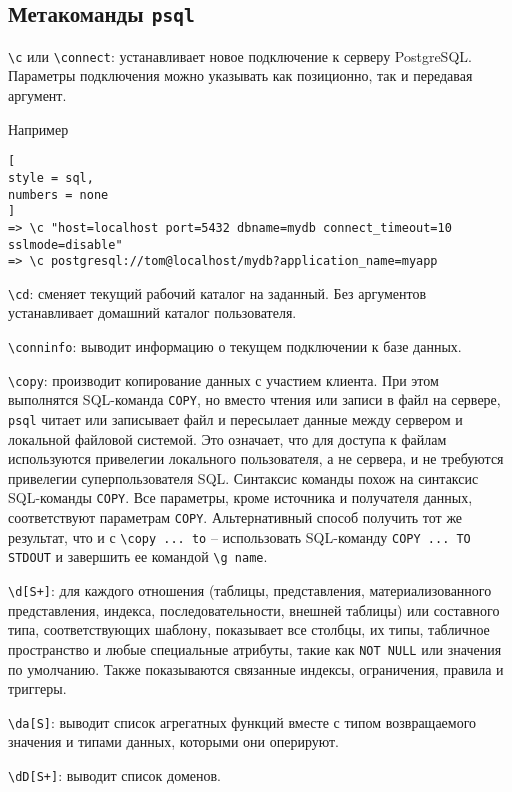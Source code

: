 \documentclass[%
	11pt,
	a4paper,
	utf8,
		]{article}
\begin{document}
\subsection{Метакоманды \texttt{psql}}

\noindent \verb|\c| или \verb|\connect|: устанавливает новое подключение к серверу PostgreSQL. Параметры подключения можно указывать как позиционно, так и передавая аргумент.

Например
\begin{lstlisting}[
style = sql,
numbers = none
]
=> \c "host=localhost port=5432 dbname=mydb connect_timeout=10 sslmode=disable"
=> \c postgresql://tom@localhost/mydb?application_name=myapp
\end{lstlisting}

\noindent \verb|\cd|: сменяет текущий рабочий каталог на заданный. Без аргументов устанавливает домашний каталог пользователя.

\noindent \verb|\conninfo|: выводит информацию о текущем подключении к базе данных.

\noindent \verb|\copy|: производит копирование данных с участием клиента. При этом выполнятся SQL-команда \texttt{COPY}, но вместо чтения или записи в файл на сервере, \texttt{psql} читает или записывает файл и пересылает данные между сервером и локальной файловой системой. Это означает, что для доступа к файлам используются привелегии локального пользователя, а не сервера, и не требуются привелегии суперпользователя SQL. Синтаксис команды похож на синтаксис SQL-команды \texttt{COPY}. Все параметры, кроме источника и получателя данных, соответствуют параметрам \texttt{COPY}. Альтернативный способ получить тот же результат, что и с \verb|\copy ... to| -- использовать SQL-команду \texttt{COPY ... TO STDOUT} и завершить ее командой \verb|\g name|.

\noindent \verb|\d[S+]|: для каждого отношения (таблицы, представления, материализованного представления, индекса, последовательности, внешней таблицы) или составного типа, соответствующих шаблону, показывает все столбцы, их типы, табличное пространство и любые специальные атрибуты, такие как \texttt{NOT NULL} или значения по умолчанию. Также показываются связанные индексы, ограничения, правила и триггеры.

\noindent\verb|\da[S]|: выводит список агрегатных функций вместе с типом возвращаемого значения и типами данных, которыми они оперируют.

\noindent\verb|\dD[S+]|: выводит список доменов.
\end{document}

